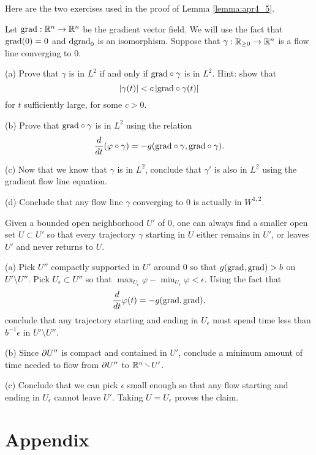 \documentclass{amsart}
\begin{document}
Here are the two exercises used in the proof of Lemma \ref{lemma:apr4_5}.
\begin{xca}\label{xca:apr4_3}
  Let $\mathrm{grad}:\mathbb{R}^{n}\to \mathbb{R}^{n}$ be the gradient vector field. We will use the fact that $\mathrm{grad}(0)=0$ and $\mathrm{d} \mathrm{grad}_{0}$ is an isomorphism. Suppose that $\gamma:\mathbb{R}_{\ge 0}\to \mathbb{R}^{n}$ is a flow line converging to $0$.

  (a) Prove that $\gamma$ is in $L^{2}$ if and only if $\mathrm{grad}\circ \gamma$ is in $L^{2}$. Hint: show that $$\left|\gamma(t)\right|<c\left|\mathrm{grad}\circ \gamma(t)\right|$$ for $t$ sufficiently large, for some $c>0$.

  (b) Prove that $\mathrm{grad}\circ \gamma$ is in $L^{2}$ using the relation
  \begin{equation*}
    \frac{d}{dt}(\varphi\circ \gamma)=-g(\mathrm{grad}\circ \gamma,\mathrm{grad}\circ \gamma).
  \end{equation*}

  (c) Now that we know that $\gamma$ is in $L^{2}$, conclude that $\gamma'$ is also in $L^{2}$ using the gradient flow line equation.

  (d) Conclude that any flow line $\gamma$ converging to $0$ is actually in $W^{1,2}$.
\end{xca}
\begin{xca}\label{xca:apr4_4}
  Given a bounded open neighborhood $U'$ of $0$, one can always find a smaller open set $U\subset U'$ so that every trajectory $\gamma$ starting in $U$ either remains in $U'$, or leaves $U'$ and never returns to $U$.

  (a) Pick $U''$ compactly supported in $U'$ around $0$ so that $g(\mathrm{grad},\mathrm{grad})>b$ on $U'\setminus U''$. Pick $U_{\epsilon}\subset U''$ so that $\max_{U_{\epsilon}} \varphi-\min_{U_{\epsilon}}\varphi<\epsilon$. Using the fact that
  \begin{equation*}
    \frac{d}{dt}\varphi(t)=-g(\mathrm{grad},\mathrm{grad}),
  \end{equation*}
  conclude that any trajectory starting and ending in $U_{\epsilon}$ must spend time less than $b^{-1}\epsilon$ in $U'\setminus U''$.

  (b) Since $\partial U''$ is compact and contained in $U'$, conclude a minimum amount of time needed to flow from $\partial U''$ to $\R^{n}\setminus U'$.

  (c) Conclude that we can pick $\epsilon$ small enough so that any flow starting and ending in $U_{\epsilon}$ cannot leave $U'$. Taking $U=U_{\epsilon}$ proves the claim. 
\end{xca}

\section*{\textbf{Appendix}}
\end{document}

